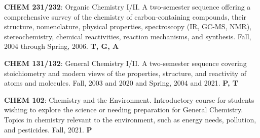 \documentclass[10pt]{article}
\newcommand*\teitem[4]{\textbf{#1}: #2 #3 \textbf{#4}}
\newcommand*\lectitem[2]{\textbf{#1} #2}
\begin{document}

\teitem{CHEM 231/232}{Organic Chemistry I/II. A two-semester sequence offering a comprehensive survey of the chemistry of carbon-containing compounds, their structure, nomenclature, physical properties, spectroscopy (IR, GC-MS, NMR), stereochemistry, chemical reactivities, reaction mechanisms, and synthesis.}{Fall, 2004 through Spring, 2006.}{T, G, A}

\teitem{CHEM 131/132}{General Chemistry I/II.  A two-semester sequence covering stoichiometry and modern views of the properties, structure, and reactivity of atoms and molecules.}{Fall, 2003 and 2020 and Spring, 2004 and 2021.}{P, T}

\teitem{CHEM 102}{Chemistry and the Environment. Introductory course for students wishing to explore the science or needing preparation for General Chemistry. Topics in chemistry relevant to the environment, such as energy needs, pollution, and pesticides.}{Fall, 2021.}{P}


\begin{comment}
\section{Invited Guest Lectures}

\lectitem{How Do You Know?}{University of Redlands Seminar. Department of Chemistry, University of Redlands, Redlands, California. January, 2020.}

\lectitem{Chemistry Through Computers.}{7th Grade Science Lecture. Blessed Sacrament Parish School, San Diego, California. January, 2015.}

\lectitem{Chemistry: College, Grad School, and Beyond.}{Guest Science Lecture. Citrus Valley High School, Redlands, California. May, 2012.}

\lectitem{Using Computers in Drug Discovery.}{University of Redlands Seminar. Department of Chemistry, University of Redlands, Redlands, California. January, 2011.}
\end{comment}
\end{document}
